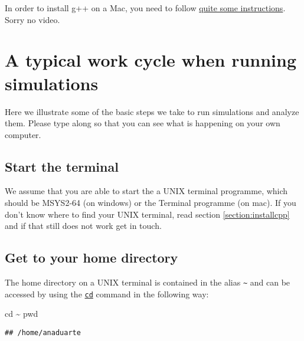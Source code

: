 \documentclass[
]{book}
\newenvironment{Shaded}{\begin{snugshade}}{\end{snugshade}}
\newcommand{\BuiltInTok}[1]{#1}
\newcommand{\NormalTok}[1]{#1}
\begin{document}
In order to install g++ on a Mac, you need to follow \href{https://www.freecodecamp.org/news/install-xcode-command-line-tools/}{quite some instructions}. Sorry no video.

\hypertarget{section}{%
\subsection{}\label{section}}

\hypertarget{a-typical-work-cycle-when-running-simulations}{%
\chapter{A typical work cycle when running simulations}\label{a-typical-work-cycle-when-running-simulations}}

Here we illustrate some of the basic steps we take to run simulations and analyze them. Please type along so that you can see what is happening on your own computer.

\hypertarget{start-the-terminal}{%
\section{Start the terminal}\label{start-the-terminal}}

We assume that you are able to start the a UNIX terminal programme, which should be MSYS2-64 (on windows) or the Terminal programme (on mac). If you don't know where to find your UNIX terminal, read section \ref{section:installcpp} and if that still does not work get in touch.

\hypertarget{get-to-your-home-directory}{%
\section{Get to your home directory}\label{get-to-your-home-directory}}

The home directory on a UNIX terminal is contained in the alias \texttt{\textasciitilde{}} and can be accessed by using the \href{https://www.tutorialspoint.com/unix_commands/cd.htm}{\texttt{cd}} command in the following way:

\begin{Shaded}
\begin{Highlighting}[]
\BuiltInTok{cd}\NormalTok{ \textasciitilde{}}
\BuiltInTok{pwd}
\end{Highlighting}
\end{Shaded}

\begin{verbatim}
## /home/anaduarte
\end{verbatim}
\end{document}
